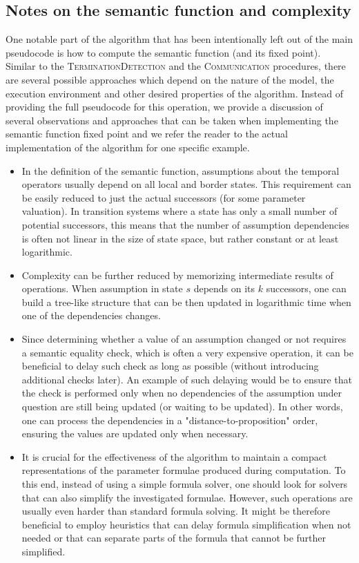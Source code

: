 \subsection{Notes on the semantic function and complexity}

One notable part of the algorithm that has been intentionally left out of the main pseudocode is how to compute the semantic function (and its fixed point). Similar to the \textsc{TerminationDetection} and the \textsc{Communication} procedures, there are several possible approaches which depend on the nature of the model, the execution environment and other desired properties of the algorithm.  Instead of providing the full pseudocode for this operation, we provide a discussion of several observations and approaches that can be taken when implementing the semantic function fixed point and we refer the reader to the actual implementation of the algorithm for one specific example.

\begin{itemize}
	\item In the definition of the semantic function, assumptions about the temporal operators usually depend on all local and border states. This requirement can be easily reduced to just the actual successors (for some parameter valuation). In transition systems where a state has only a small number of potential successors, this means that the number of assumption dependencies is often not linear in the size of state space, but rather constant or at least logarithmic.
	\item Complexity can be further reduced by memorizing intermediate results of operations. When assumption in state $s$ depends on its $k$ successors, one can build a tree-like structure that can be then updated in logarithmic time when one of the dependencies changes.
	\item Since determining whether a value of an assumption changed or not requires a semantic equality check, which is often a very expensive operation, it can be beneficial to delay such check as long as possible (without introducing additional checks later). An example of such delaying would be to ensure that the check is performed only when no dependencies of the assumption under question are still being updated (or waiting to be updated). In other words, one can process the dependencies in a "distance-to-proposition" order, ensuring the values are updated only when necessary.
	\item It is crucial for the effectiveness of the algorithm to maintain a compact representations of the parameter formulae produced during computation. To this end, instead of using a simple formula solver, one should look for solvers that can also simplify the investigated formulae. However, such operations are usually even harder than standard formula solving. It might be therefore beneficial to employ heuristics that can delay formula simplification when not needed or that can separate parts of the formula that cannot be further simplified.
\end{itemize}


